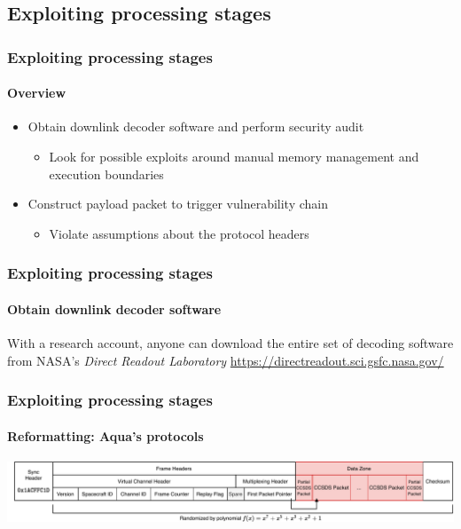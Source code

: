 \documentclass{beamer}
\begin{document}

\subsection{Exploiting processing stages}

\begin{frame}
  \frametitle{Exploiting processing stages}
  \framesubtitle{Overview}
  \begin{itemize}
   \item Obtain downlink decoder software and perform security audit
   \begin{itemize}
     \item Look for possible exploits around manual memory management and execution boundaries
   \end{itemize}

    \item Construct payload packet to trigger vulnerability chain
    \begin{itemize}
      \item Violate assumptions about the protocol headers
    \end{itemize}
  \end{itemize}
\end{frame}

\begin{frame}
  \frametitle{Exploiting processing stages}
  \framesubtitle{Obtain downlink decoder software}
  With a research account, anyone can download the entire set of decoding software from NASA's \textit{Direct Readout Laboratory}
  \url{https://directreadout.sci.gsfc.nasa.gov/}
\end{frame}

\begin{frame}
  \frametitle{Exploiting processing stages}
  \framesubtitle{Reformatting: Aqua's protocols}
  \includegraphics[width=\textwidth]{images/cadu_diagram.pdf}
\end{frame}
\end{document}
